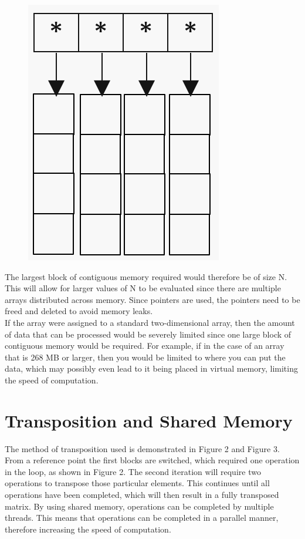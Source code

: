 \documentclass[conference]{IEEEtran}
\begin{document}
\noindent
\begin{figure}[H]
\centering
\includegraphics[scale = 0.5]{Figure1.png}
\caption{}
\end{figure}


The largest block of contiguous memory required would therefore be of size N. This will allow for larger values of N to be evaluated since there are multiple arrays distributed across memory. Since pointers are used, the pointers need to be freed and deleted to avoid memory leaks. \\


If the array were assigned to a standard two-dimensional array, then the amount of data that can be processed would be severely limited since one large block of contiguous memory would be required. For example, if in the case of an array that is 268 MB or larger, then you would be limited to where you can put the data, which may possibly even lead to it being placed in virtual memory, limiting the speed of computation. \\


\section{Transposition and Shared Memory}

The method of transposition used is demonstrated in Figure 2 and Figure 3. From a reference point the first blocks are switched, which required one operation in the loop, as shown in Figure 2. The second iteration will require two operations to transpose those particular elements. This continues until all operations have been completed, which will then result in a fully transposed matrix. By using shared memory, operations can be completed by multiple threads. This means that operations can be completed in a parallel manner, therefore increasing the speed of computation. \\
\end{document}
